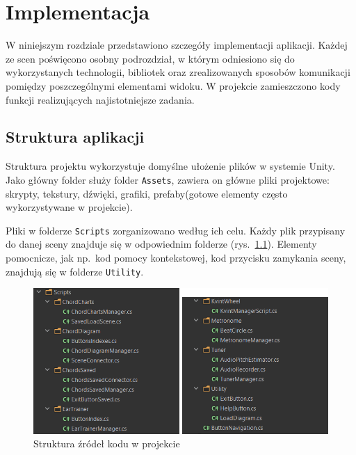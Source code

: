 \chapter{Implementacja}

W niniejszym rozdziale przedstawiono szczegóły implementacji aplikacji. Każdej ze scen poświęcono osobny podrozdział, w którym odniesiono się do wykorzystanych technologii, bibliotek oraz zrealizowanych sposobów komunikacji pomiędzy poszczególnymi elementami widoku. W projekcie zamieszczono kody funkcji realizujących najistotniejsze zadania.

\section{Struktura aplikacji}
Struktura projektu wykorzystuje domyślne ułożenie plików w systemie Unity. Jako główny folder służy folder \texttt{Assets}, zawiera on główne pliki projektowe: skrypty, tekstury, dźwięki, grafiki, prefaby(gotowe elementy często wykorzystywane w projekcie).

Pliki w folderze \texttt{Scripts} zorganizowano według ich celu. Każdy plik przypisany do danej sceny znajduje się w odpowiednim folderze (rys.~\ref{fig:strukturaKodu}). Elementy pomocnicze, jak np.\ kod pomocy kontekstowej, kod przycisku zamykania sceny, znajdują się w folderze \texttt{Utility}. 
 
\begin{figure}[htb]
     \centering
 	\includegraphics[scale=.8]{rys04/StrukturaPlikow}
	\caption{Struktura źródeł kodu w projekcie}
	\label{fig:strukturaKodu}
\end{figure}

